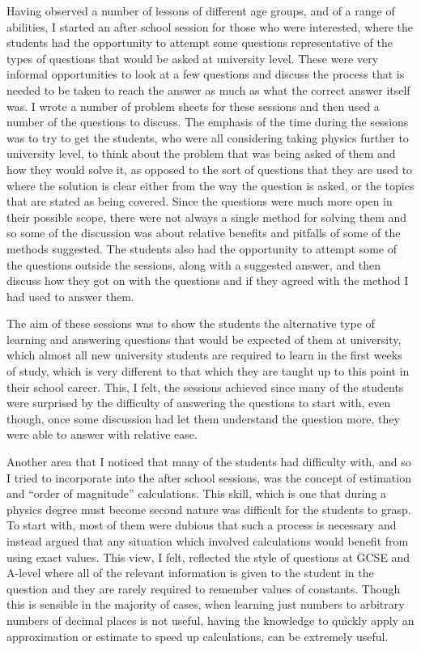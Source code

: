 	Having observed a number of lessons of different age groups, and of a range of abilities, I started an after school session for those who were interested, where the students had the opportunity to attempt some questions representative of the types of questions that would be asked at university level. These were very informal opportunities to look at a few questions and discuss the process that is needed to be taken to reach the answer as much as what the correct answer itself was. I wrote a number of problem sheets for these sessions and then used a number of the questions to discuss. The emphasis of the time during the sessions was to try to get the students, who were all considering taking physics further to university level, to think about the problem that was being asked of them and how they would solve it, as opposed to the sort of questions that they are used to where the solution is clear either from the way the question is asked, or the topics that are stated as being covered. Since the questions were much more open in their possible scope, there were not always a single method for solving them and so some of the discussion was about relative benefits and pitfalls of some of the methods suggested. The students also had the opportunity to attempt some of the questions outside the sessions, along with a suggested answer, and then discuss how they got on with the questions and if they agreed with the method I had used to answer them.

	The aim of these sessions was to show the students the alternative type of learning and answering questions that would be expected of them at university, which almost all new university students are required to learn in the first weeks of study, which is very different to that which they are taught up to this point in their school career. This, I felt, the sessions achieved since many of the students were surprised by the difficulty of answering the questions to start with, even though, once some discussion had let them understand the question more, they were able to answer with relative ease.

    Another area that I noticed that many of the students had difficulty with, and so I tried to incorporate into the after school sessions, was the concept of estimation and ``order of magnitude'' calculations. This skill, which is one that during a physics degree must become second nature was difficult for the students to grasp. To start with, most of them were dubious that such a process is necessary and instead argued that any situation which involved calculations would benefit from using exact values. This view, I felt, reflected the style of questions at GCSE and A-level where all of the relevant information is given to the student in the question and they are rarely required to remember values of constants. Though this is sensible in the majority of cases, when learning just numbers to arbitrary numbers of decimal places is not useful, having the knowledge to quickly apply an approximation or estimate to speed up calculations, can be extremely useful.

